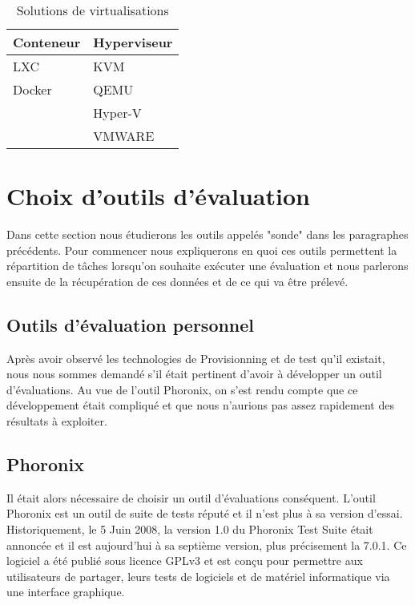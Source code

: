 \begin{table}[h]
\centering
\caption{Solutions de virtualisations}
\label{Solution de virtualisations}
\begin{tabular}{|l|l|}
\hline
Conteneur & Hyperviseur \\ \hline
LXC       & KVM         \\
Docker    & QEMU        \\
          & Hyper-V     \\
          & VMWARE      \\ \hline
\end{tabular}
\end{table}
\newpage

\section{Choix d'outils d'évaluation}

Dans cette section nous étudierons les outils appelés "sonde" dans les paragraphes précédents. Pour commencer nous expliquerons en quoi ces outils permettent la répartition de tâches lorsqu'on souhaite exécuter une évaluation et nous parlerons ensuite de la récupération de ces données et de ce qui va être prélevé. 

\subsection{Outils d'évaluation personnel}

Après avoir observé les technologies de Provisionning et de test qu'il existait, nous nous sommes demandé s'il était pertinent d'avoir à développer un outil d'évaluations. Au vue de l'outil Phoronix, on s'est rendu compte que ce développement était compliqué et que nous n'aurions pas assez rapidement des résultats à exploiter. 

\subsection{Phoronix}
Il était alors nécessaire de choisir un outil d'évaluations conséquent. L'outil Phoronix est un outil de suite de tests réputé et il n'est plus à sa version d'essai. Historiquement, le 5 Juin 2008, la version 1.0 du Phoronix Test Suite était annoncée et il est aujourd'hui à sa septième version, plus précisement la 7.0.1. Ce logiciel a été publié sous licence GPLv3 et est conçu pour permettre aux utilisateurs de partager, leurs tests de logiciels et de matériel informatique via une interface graphique.
\newpage
